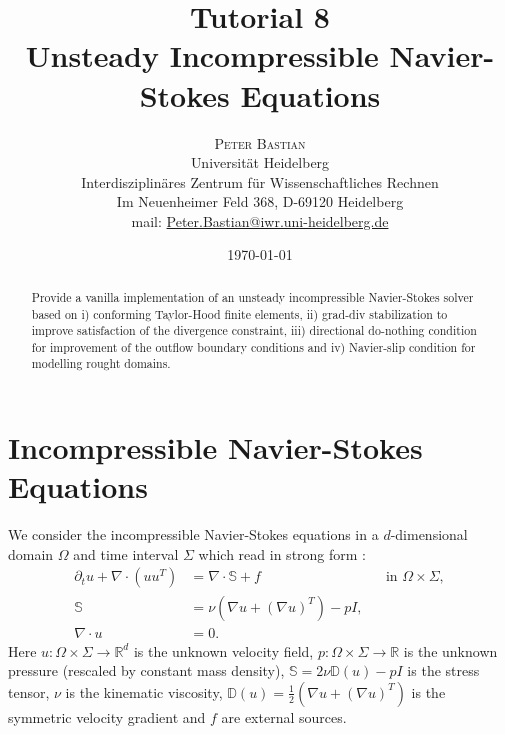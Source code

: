 \documentclass[a4paper,
		     12pt,
		     DIV10,
		     DIVcalc,
		     headings=normal,
		     oneside,
		     bibliography=totoc,
		     headsepline=false,
		     headinclude]{scrartcl}
\title{Tutorial 8\\ Unsteady Incompressible Navier-Stokes Equations}
\author{\textsc{Peter Bastian}\\
  Universität Heidelberg\\
  Interdisziplinäres Zentrum für Wissenschaftliches Rechnen\\
  Im Neuenheimer Feld 368, D-69120 Heidelberg\\
mail: \url{Peter.Bastian@iwr.uni-heidelberg.de}
}
\date{\today}
\theoremstyle{definition}
\begin{document}
\maketitle

\begin{abstract}
Provide a vanilla implementation of an unsteady incompressible Navier-Stokes
solver based on i) conforming Taylor-Hood finite elements, ii) grad-div stabilization to
improve satisfaction of the divergence constraint, iii) directional do-nothing condition
for improvement of the outflow boundary conditions and iv) Navier-slip condition for
modelling rought domains.
\end{abstract}

\tableofcontents

\section{Incompressible Navier-Stokes Equations}

We consider the incompressible Navier-Stokes equations in a $d$-dimensional domain $\Omega$ and time
interval $\Sigma$ which read in strong form \cite{JohnLectureNotes}:
\begin{subequations}
\begin{align}
\partial_t u + \nabla\cdot(u u^T)  &= \nabla \cdot \mathbb{S} + f &&\text{in $\Omega\times\Sigma$},\\
\mathbb{S} &= \nu \left( \nabla u + (\nabla u)^T \right) - pI,\\
\nabla\cdot u &= 0 .
\end{align}
\end{subequations}
Here $u:\Omega\times\Sigma\to\mathbb{R}^d$ is the unknown velocity field, 
$p:\Omega\times\Sigma\to\mathbb{R}$ is the unknown pressure (rescaled by constant mass density),
$\mathbb{S} = 2\nu\mathbb{D}(u)-pI$ is the stress tensor, $\nu$ is the kinematic viscosity,
$\mathbb{D}(u)=\frac12 \left( \nabla u + (\nabla u)^T \right)$ is the symmetric velocity gradient and $f$ are external sources.
\end{document}
